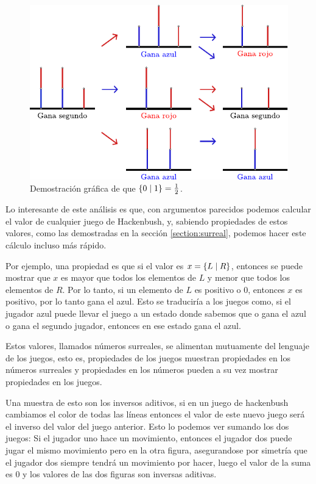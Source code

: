\begin{figure}[h]
    \centering
    \includegraphics[width=.7\textwidth]{images/hackenbush-half_proof.pdf}
    \caption{Demostraci\'on gr\'afica de que $\left\{0\;\middle|\; 1\right\}=\frac{1}{2}$.}
    \label{figure:hackenbush-half_proof}
\end{figure}

Lo interesante de este an\'alisis es que, con argumentos parecidos podemos calcular el valor de cualquier juego de Hackenbush, y, sabiendo propiedades de estos valores, como las demostradas en la secci\'on \ref{section:surreal}, podemos hacer este c\'alculo incluso m\'as r\'apido.

Por ejemplo, una propiedad es que si el valor es $x=\left\{L\;\middle|\; R\right\}$, entonces se puede mostrar que $x$ es mayor que todos los elementos de $L$ y menor que todos los elementos de $R$. Por lo tanto, si un elemento de $L$ es positivo o $0$, entonces $x$ es positivo, por lo tanto gana el azul. Esto se traducir\'ia a los juegos como, si el jugador azul puede llevar el juego a un estado donde sabemos que o gana el azul o gana el segundo jugador, entonces en ese estado gana el azul.

Estos valores, llamados n\'umeros surreales, se alimentan mutuamente del lenguaje de los juegos, esto es, propiedades de los juegos muestran propiedades en los n\'umeros surreales y propiedades en los n\'umeros pueden a su vez mostrar propiedades en los juegos.

Una muestra de esto son los inversos aditivos, si en un juego de hackenbush cambiamos el color de todas las l\'ineas entonces el valor de este nuevo juego ser\'a el inverso del valor del juego anterior. Esto lo podemos ver sumando los dos juegos: Si el jugador uno hace un movimiento, entonces el jugador dos puede jugar el mismo movimiento pero en la otra figura, asegurandose por simetr\'ia que el jugador dos siempre tendr\'a un movimiento por hacer, luego el valor de la suma es $0$ y los valores de las dos figuras son inversas aditivas.

